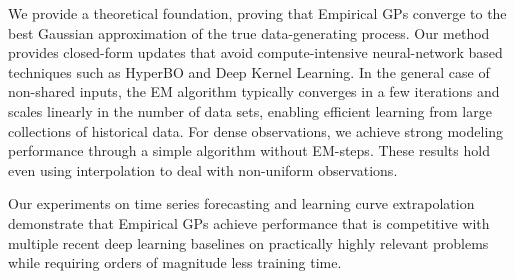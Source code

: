 \documentclass{article}
\begin{document}
We provide a theoretical foundation, proving that Empirical GPs converge to the best Gaussian approximation of the true data-generating process. Our method provides closed-form updates that avoid compute-intensive neural-network based techniques such as HyperBO and Deep Kernel Learning. In the general case of non-shared inputs, the EM algorithm typically converges in a few iterations and scales linearly in the number of data sets, enabling efficient learning from large collections of historical data.
For dense observations, we achieve strong modeling performance through a simple algorithm without EM-steps. These results hold even using interpolation to deal with non-uniform observations.

Our experiments on time series forecasting and learning curve extrapolation demonstrate that Empirical GPs achieve performance that is competitive with multiple recent deep learning baselines on practically highly relevant problems while requiring orders of magnitude less training time.

\end{document}
